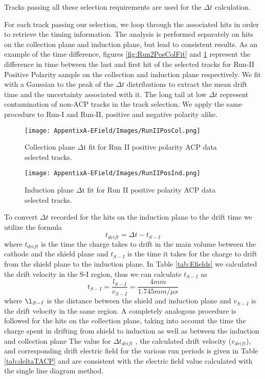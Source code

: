Tracks passing all these selection requirements are used for the $\Delta t$ calculation.

For each track passing our selection, we loop through the associated hits in order to retrieve the timing information. The analysis is performed separately on hits on the collection plane and induction plane, but lead to consistent results. As an example of the time difference, figures \ref{fig:Run2PosColFit} and \ref{fig:Run2PosIndFit} represent the difference in time between the last and first hit of the selected tracks for Run-II Positive Polarity sample on the collection and induction plane respectively.  We fit with a Gaussian to the peak of the $\Delta t$ distributions to extract the mean drift time and the uncertainty associated with it. The long tail at low $\Delta t$ represent contamination of non-ACP tracks in the track selection.  We apply the same procedure to Run-I and Run-II, positive and negative polarity alike.

   
\begin{figure}[h!]
\begin{minipage}{0.40\textwidth}
\centering
\texttt{[image: AppentixA-EField/Images/RunIIPosCol.png]}
\caption{Collection plane $\Delta$t fit for Run II positive polarity ACP data  selected tracks.}
\label{fig:Run2PosColFit}
\end{minipage}\hfill
\begin{minipage}{0.40\textwidth}
\centering
\texttt{[image: AppentixA-EField/Images/RunIIPosInd.png]}
\caption{Induction plane $\Delta$t fit for Run II positive polarity ACP data  selected tracks.}
\label{fig:Run2PosIndFit}
\end{minipage}
\end{figure}

To convert $\Delta t$ recorded for the hits on the induction plane to the drift time we utilize the formula
\begin{equation}
t_{drift} = \Delta t - t_{S-I}
\end{equation}
where $t_{drift}$ is the time the charge takes to drift in the main volume between the cathode and the shield plane and $t_{S-I}$ is the time it takes for the charge to drift from the shield plane to the induction plane. In Table \ref{tab:Efields} we calculated the drift velocity in the S-I region, thus we can calculate $t_{S-I}$ as 
\begin{equation}
t_{S-I} = \frac{l_{S-I}}{v_{S-I}} = \frac{4 mm}{1.745 mm/ \mu s}
\end{equation}
where $\l_{S-I}$ is the distance between the shield and induction plane and $v_{S-I}$ is the drift velocity in the same region. A completely analogous procedure is followed for the hits on the collection plane, taking into account the time the charge spent in drifting from shield to induction as well as between the induction and collection plane
The value for $\Delta t_{drift}$ , the calculated drift velocity ($v_{drift}$), and corresponding drift electric field for the various run periods is given in Table \ref{tab:deltaTACP} and are consistent with the electric field value calculated with the single line diagram method.

